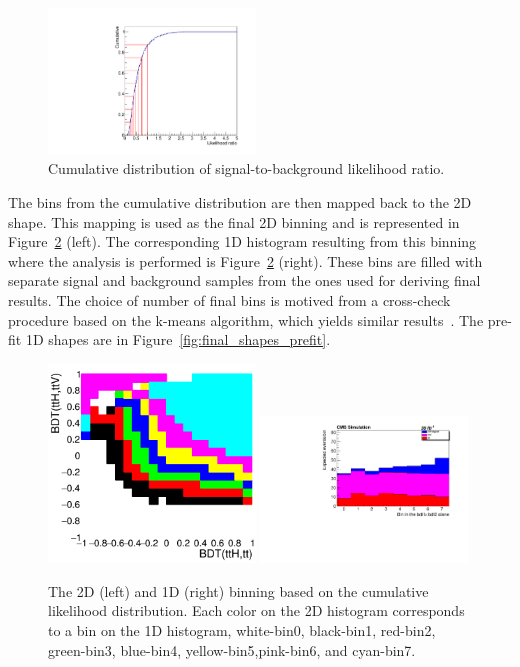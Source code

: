 \begin{figure}[htp]
\centering
\includegraphics[width=0.49\textwidth]{ch9_figs/cumulative_2lss.pdf}
\caption[Cumulative distribution of signal-to-background likelihood ratio]{Cumulative distribution of signal-to-background likelihood ratio.}
\label{fig:cum_dist}
\end{figure}

\noindent The bins from the cumulative distribution are then mapped back to the 2D shape. This mapping is used as the final 2D binning and is represented in Figure~\ref{fig:likelihood} (left).
The corresponding 1D histogram resulting from this binning where the analysis is performed is Figure~\ref{fig:likelihood} (right). These bins are filled with separate signal and background
samples from the ones used for deriving final results. The choice of number of final bins is motived from a cross-check procedure based on the k-means algorithm, which yields similar
results~\cite{CMS-AN-17-029}. The pre-fit 1D shapes are in Figure~\ref{fig:final_shapes_prefit}. 

\begin{figure}[htp]
\centering
\includegraphics[width=0.49\textwidth]{ch9_figs/likelihoodBased_2d_2lss.png}
\includegraphics[width=0.49\textwidth]{ch9_figs/likelihoodBased_1d_2lss.pdf}
\caption[The 2D and 1D binning based on the cumulative likelihood distribution]{The 2D (left) and 1D (right) binning based on the cumulative likelihood distribution.
Each color on the 2D histogram corresponds to a bin on the 1D histogram, white-bin0, black-bin1, red-bin2, green-bin3, blue-bin4, yellow-bin5,pink-bin6, and cyan-bin7.}
\label{fig:likelihood}
\end{figure}

